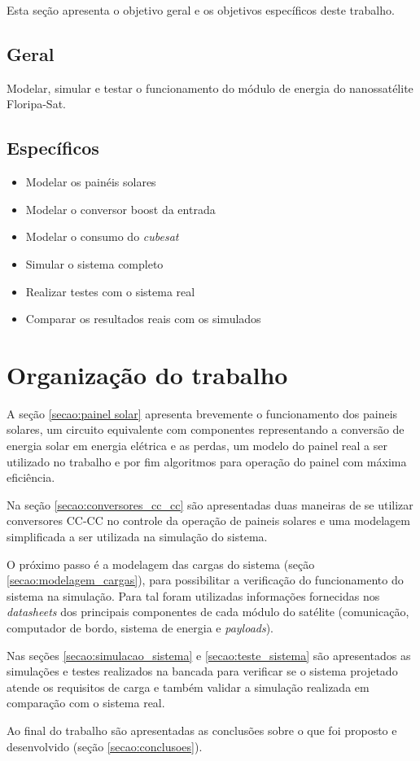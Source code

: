 Esta seção apresenta o objetivo geral e os objetivos específicos deste trabalho.

\subsection{Geral}

Modelar, simular e testar o funcionamento do módulo de energia do nanossatélite Floripa-Sat.

\subsection{Específicos}
\begin{itemize}
\item Modelar os painéis solares
\item Modelar o conversor boost da entrada
\item Modelar o consumo do \textit{cubesat}
\item Simular o sistema completo
\item Realizar testes com o sistema real
\item Comparar os resultados reais com os simulados
\end{itemize}

\section{Organização do trabalho}

A seção \ref{secao:painel solar} apresenta brevemente o funcionamento dos paineis solares, um circuito equivalente com componentes representando a conversão de energia solar em energia elétrica e as perdas, um modelo do painel real a ser utilizado no trabalho e por fim algoritmos para operação do painel com máxima eficiência.

Na seção \ref{secao:conversores_cc_cc} são apresentadas duas maneiras de se utilizar conversores CC-CC no controle da operação de paineis solares e uma modelagem simplificada a ser utilizada na simulação do sistema.

O próximo passo é a modelagem das cargas do sistema (seção \ref{secao:modelagem_cargas}), para possibilitar a verificação do funcionamento do sistema na simulação. Para tal foram utilizadas informações fornecidas nos \textit{datasheets} dos principais componentes de cada módulo do satélite (comunicação, computador de bordo, sistema de energia e \textit{payloads}).

Nas seções \ref{secao:simulacao_sistema} e \ref{secao:teste_sistema} são apresentados as simulações e testes realizados na bancada para verificar se o sistema projetado atende os requisitos de carga e também validar a simulação realizada em comparação com o sistema real.

Ao final do trabalho são apresentadas as conclusões sobre o que foi proposto e desenvolvido (seção \ref{secao:conclusoes}).


